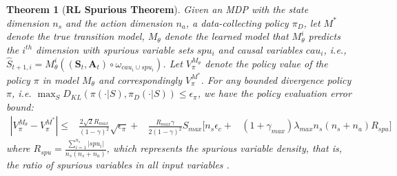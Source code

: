 \documentclass{article}
\theoremstyle{plain}
\newtheorem{theorem}{Theorem}[section]
\theoremstyle{definition}
\theoremstyle{remark}
\begin{document}
\begin{theorem}[\textbf{RL Spurious Theorem}]
Given an MDP with the state dimension $n_s$ and the action dimension $n_a$, 
a data-collecting policy $\pi_D$,
let $M^*$ denote the true transition model, 
$M_\theta$ denote the learned model that $M_\theta^i$ predicts the $i^{th}$ dimension with spurious variable sets $spu_i$ and causal variables $cau_i$, i.e.,  $\hat{S}_{t+1,i}=M^i_{\theta}((\textbf{S}_t,\textbf{A}_t)\circ \omega_{cau_i\cup spu_i})$.
Let $V_{\pi}^{M_\theta}$ denote the policy value of the policy $\pi$ in model $M_{\theta}$ and correspondingly $V_{\pi}^{M^*}$.
For any bounded divergence policy $\pi$, i.e. $\max_{S} D_{KL}(\pi(\cdot|S),\pi_{D}(\cdot|S))\leq \epsilon_{\pi}$, we have the policy evaluation error bound:
\begin{align}
|V_{\pi}^{M_\theta}-V_{\pi}^{M^*}|\leq &
\frac{2\sqrt{2}R_{max}}{(1-\gamma)^2}\sqrt{\epsilon_{\pi}}+ 
&\frac{R_{max}\gamma}{2(1-\gamma)^2}S_{max}[n_s\epsilon_c+
&(1+\gamma_{max})\lambda_{max}n_s(n_s+n_a)R_{spu}]
\end{align}
where $R_{spu}=\frac{\sum_{i=1}^{n_s}|spu_i|}{n_s(n_s+n_a)}$, which represents the spurious variable density, that is, the ratio of spurious variables in all input variables .
\end{theorem}
\end{document}
